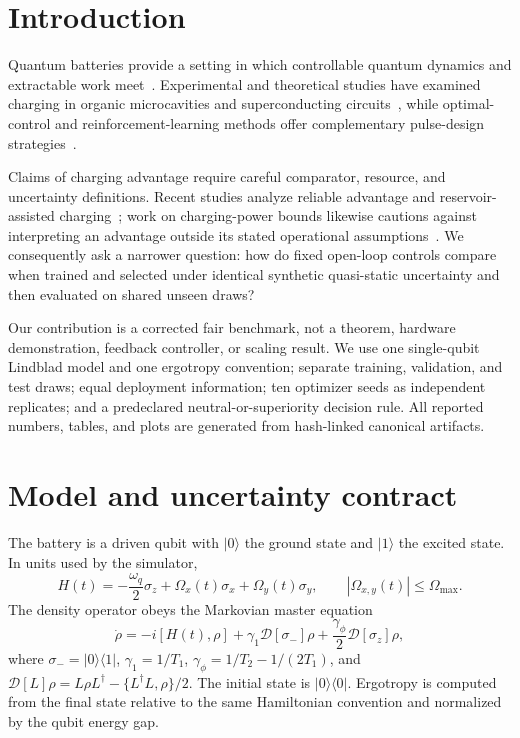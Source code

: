 \documentclass[preprint,aps,pra,superscriptaddress,longbibliography]{revtex4-2}
\begin{document}
\section{Introduction}
Quantum batteries provide a setting in which controllable quantum dynamics and extractable work meet~\cite{alicki2013entanglement,campaioli2024colloquium,ferraro2018high}.  Experimental and theoretical studies have examined charging in organic microcavities and superconducting circuits~\cite{quach2022superabsorption,hu2022optimal,li2025stable}, while optimal-control and reinforcement-learning methods offer complementary pulse-design strategies~\cite{khaneja2005optimal,niu2019universal,porotti2019coherent}.

Claims of charging advantage require careful comparator, resource, and uncertainty definitions.  Recent studies analyze reliable advantage and reservoir-assisted charging~\cite{rinaldi2025reliable,yao2025reservoir}; work on charging-power bounds likewise cautions against interpreting an advantage outside its stated operational assumptions~\cite{sreeram2025deceptive}.  We consequently ask a narrower question: how do fixed open-loop controls compare when trained and selected under identical synthetic quasi-static uncertainty and then evaluated on shared unseen draws?

Our contribution is a corrected fair benchmark, not a theorem, hardware demonstration, feedback controller, or scaling result.  We use one single-qubit Lindblad model and one ergotropy convention; separate training, validation, and test draws; equal deployment information; ten optimizer seeds as independent replicates; and a predeclared neutral-or-superiority decision rule.  All reported numbers, tables, and plots are generated from hash-linked canonical artifacts.

\section{Model and uncertainty contract}
The battery is a driven qubit with $\lvert0\rangle$ the ground state and $\lvert1\rangle$ the excited state.  In units used by the simulator,
\begin{equation}
 H(t)=-\frac{\omega_q}{2}\sigma_z+\Omega_x(t)\sigma_x+\Omega_y(t)\sigma_y,
 \qquad |\Omega_{x,y}(t)|\leq\Omega_{\max}.
\end{equation}
The density operator obeys the Markovian master equation
\begin{equation}
 \dot\rho=-i[H(t),\rho]+\gamma_1\mathcal D[\sigma_-]\rho
 +\frac{\gamma_\phi}{2}\mathcal D[\sigma_z]\rho,
\end{equation}
where $\sigma_-=\lvert0\rangle\!\langle1\rvert$, $\gamma_1=1/T_1$, $\gamma_\phi=1/T_2-1/(2T_1)$, and $\mathcal D[L]\rho=L\rho L^\dagger-\{L^\dagger L,\rho\}/2$.  The initial state is $\lvert0\rangle\!\langle0\rvert$.  Ergotropy is computed from the final state relative to the same Hamiltonian convention and normalized by the qubit energy gap.
\end{document}
